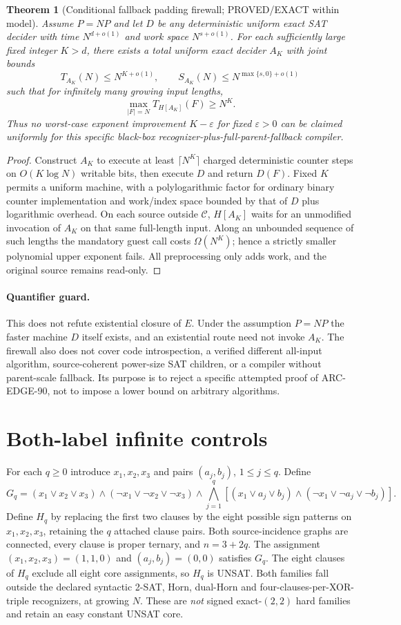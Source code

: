 \documentclass[11pt]{article}
\newtheorem{theorem}{Theorem}
\begin{document}
\begin{theorem}[Conditional fallback padding firewall; PROVED/EXACT within model]
Assume $P=NP$ and let $D$ be any deterministic uniform exact SAT decider with time $N^{d+o(1)}$ and work space $N^{s+o(1)}$. For each sufficiently large fixed integer $K>d$, there exists a total uniform exact decider $A_K$ with joint bounds
\[
T_{A_K}(N)\le N^{K+o(1)},\qquad
S_{A_K}(N)\le N^{\max\{s,0\}+o(1)}
\]
such that for infinitely many growing input lengths,
\[
\max_{|F|=N} T_{H[A_K]}(F)\ge N^K.
\]
Thus no worst-case exponent improvement $K-\varepsilon$ for fixed $\varepsilon>0$ can be claimed uniformly for this specific black-box recognizer-plus-full-parent-fallback compiler.
\end{theorem}
\begin{proof}
Construct $A_K$ to execute at least $\lceil N^K\rceil$ charged deterministic counter steps on $O(K\log N)$ writable bits, then execute $D$ and return $D(F)$. Fixed $K$ permits a uniform machine, with a polylogarithmic factor for ordinary binary counter implementation and work/index space bounded by that of $D$ plus logarithmic overhead. On each source outside $\mathcal C$, $H[A_K]$ waits for an unmodified invocation of $A_K$ on that same full-length input. Along an unbounded sequence of such lengths the mandatory guest call costs $\Omega(N^K)$; hence a strictly smaller polynomial upper exponent fails. All preprocessing only adds work, and the original source remains read-only.
\end{proof}
\paragraph{Quantifier guard.}
This does not refute existential closure of $E$. Under the assumption $P=NP$ the faster machine $D$ itself exists, and an existential route need not invoke $A_K$. The firewall also does not cover code introspection, a verified different all-input algorithm, source-coherent power-size SAT children, or a compiler without parent-scale fallback. Its purpose is to reject a specific attempted proof of ARC-EDGE-90, not to impose a lower bound on arbitrary algorithms.

\section{Both-label infinite controls}
For each $q\ge0$ introduce $x_1,x_2,x_3$ and pairs $(a_j,b_j)$, $1\le j\le q$. Define
\[
G_q=(x_1\vee x_2\vee x_3)\land
(\neg x_1\vee\neg x_2\vee\neg x_3)
\land\bigwedge_{j=1}^q
[(x_1\vee a_j\vee b_j)\land
(\neg x_1\vee\neg a_j\vee\neg b_j)].
\]
Define $H_q$ by replacing the first two clauses by the eight possible sign patterns on $x_1,x_2,x_3$, retaining the $q$ attached clause pairs. Both source-incidence graphs are connected, every clause is proper ternary, and $n=3+2q$. The assignment $(x_1,x_2,x_3)=(1,1,0)$ and $(a_j,b_j)=(0,0)$ satisfies $G_q$. The eight clauses of $H_q$ exclude all eight core assignments, so $H_q$ is UNSAT. Both families fall outside the declared syntactic 2-SAT, Horn, dual-Horn and four-clauses-per-XOR-triple recognizers, at growing $N$. These are \emph{not} signed exact-$(2,2)$ hard families and retain an easy constant UNSAT core.
\end{document}
